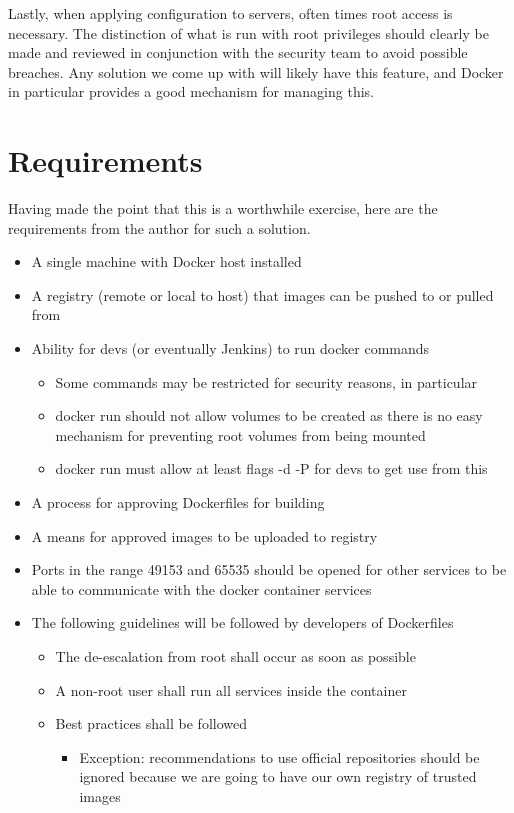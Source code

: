 \documentclass[twocolumn]{article}
\begin{document}
\par
Lastly, when applying configuration to servers, often times root access is necessary.
The distinction of what is run with root privileges should clearly be made and reviewed in conjunction with the security team to avoid possible breaches.
Any solution we come up with will likely have this feature, and Docker in particular provides a good mechanism for managing this.

\section{Requirements}

Having made the point that this is a worthwhile exercise, here are the requirements from the author for such a solution.

\begin{itemize}
  \item A single machine with Docker host installed
  \item A registry (remote or local to host) that images can be pushed to or pulled from
  \item Ability for devs (or eventually Jenkins) to run docker commands
  \begin{itemize}
    \item Some commands may be restricted for security reasons, in particular
    \item docker run should not allow volumes to be created as there is no easy mechanism for preventing root volumes from being mounted
    \item docker run must allow at least flags -d -P for devs to get use from this
  \end{itemize}
  \item A process for approving Dockerfiles for building
  \item A means for approved images to be uploaded to registry
  \item Ports in the range 49153 and 65535 should be opened for other services to be able to communicate with the docker container services
  \item The following guidelines will be followed by developers of Dockerfiles
  \begin{itemize}
    \item The de-escalation from root shall occur as soon as possible
    \item A non-root user shall run all services inside the container
	\item Best practices \cite{dockerbestpractices} shall be followed
    \begin{itemize}
      \item Exception: recommendations to use official repositories should be ignored because we are going to have our own registry of trusted images
    \end{itemize}
  \end{itemize}
\end{itemize}
\end{document}
